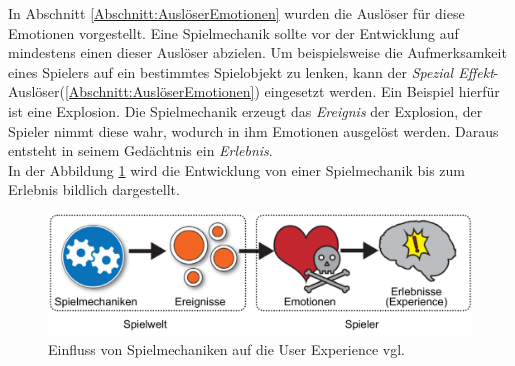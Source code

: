 In Abschnitt \ref{Abschnitt:AuslöserEmotionen} wurden die Auslöser für diese Emotionen vorgestellt. Eine Spielmechanik sollte vor der Entwicklung auf mindestens einen dieser Auslöser abzielen. Um beispielsweise die Aufmerksamkeit eines Spielers auf ein bestimmtes Spielobjekt zu lenken, kann der \textit{Spezial Effekt}-Auslöser(\ref{Abschnitt:AuslöserEmotionen}) eingesetzt werden. Ein Beispiel hierfür ist eine Explosion. Die Spielmechanik erzeugt das \textit{Ereignis} der Explosion, der Spieler nimmt diese wahr, wodurch in ihm Emotionen ausgelöst werden. Daraus entsteht in seinem Gedächtnis ein \textit{Erlebnis}. \cite[S. 7]{Adams:1515529} \\
In der Abbildung \ref{pic:mechEreigEmoErlebnis} wird die Entwicklung von einer Spielmechanik bis zum Erlebnis bildlich dargestellt.


\begin{figure}[H]
    \centering
    \includegraphics[width=.9\textwidth]{files/games/uxInGames}
    \caption{Einfluss von Spielmechaniken auf die User Experience vgl. \cite[S. 44]{Adams:1515529}}
    \label{pic:mechEreigEmoErlebnis}
\end{figure}





